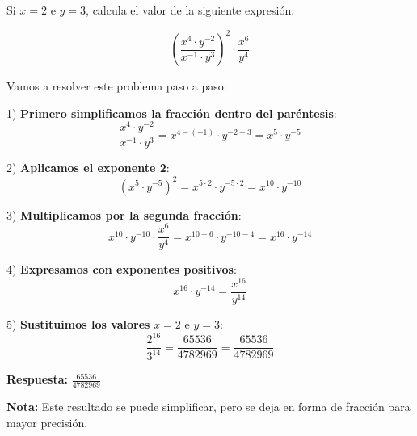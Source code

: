 \begin{ejercicio}[
  id=MATU_ALG_004,
  materia_principal=matematicas_preuniversitaria,
  codigo_materia=MATU,
  capitulo=algebra,
  subtema=exponentes,
  nivel=intermedio,
  procedencia="Examen UNI 2024",
  visibilidad=web_impreso,
  tiempo_estimado=5,
  libros={algebra_pre, algebra_intermedio},
  dificultad=2,
  tags={exponentes},
  youtube_url="",
  mostrar_solucion=true,
  libro_promocion=""
]

Si $x = 2$ e $y = 3$, calcula el valor de la siguiente expresión:

$$\left(\frac{x^4 \cdot y^{-2}}{x^{-1} \cdot y^3}\right)^2 \cdot \frac{x^6}{y^4}$$

\begin{solucion}

Vamos a resolver este problema paso a paso:

1) \textbf{Primero simplificamos la fracción dentro del paréntesis}:
   $$\frac{x^4 \cdot y^{-2}}{x^{-1} \cdot y^3} = x^{4-(-1)} \cdot y^{-2-3} = x^5 \cdot y^{-5}$$

2) \textbf{Aplicamos el exponente 2}:
   $$\left(x^5 \cdot y^{-5}\right)^2 = x^{5 \cdot 2} \cdot y^{-5 \cdot 2} = x^{10} \cdot y^{-10}$$

3) \textbf{Multiplicamos por la segunda fracción}:
   $$x^{10} \cdot y^{-10} \cdot \frac{x^6}{y^4} = x^{10+6} \cdot y^{-10-4} = x^{16} \cdot y^{-14}$$

4) \textbf{Expresamos con exponentes positivos}:
   $$x^{16} \cdot y^{-14} = \frac{x^{16}}{y^{14}}$$

5) \textbf{Sustituimos los valores} $x = 2$ e $y = 3$:
   $$\frac{2^{16}}{3^{14}} = \frac{65536}{4782969} = \frac{65536}{4782969}$$

\textbf{Respuesta:} $\frac{65536}{4782969}$

\textbf{Nota:} Este resultado se puede simplificar, pero se deja en forma de fracción para mayor precisión.
\end{solucion}
\end{ejercicio}